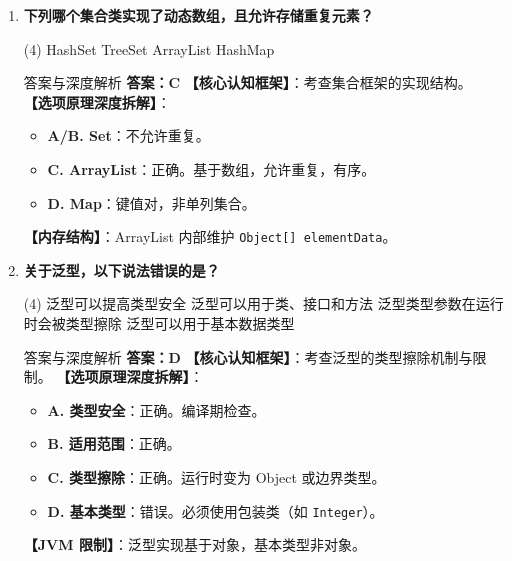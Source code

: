 ﻿\documentclass[12pt, a4paper]{ctexart}
\newcommand{\code}[1]{\texttt{#1}}
\begin{document}
\begin{enumerate}[label=\textbf{\arabic*.}, itemsep=1em]
	\item \textbf{下列哪个集合类实现了动态数组，且允许存储重复元素？}
	      \begin{tasks}(4)
		      \task HashSet \task TreeSet \task ArrayList \task HashMap
	      \end{tasks}
	      \begin{bluebox}{答案与深度解析}
		      \textbf{答案：C}
		      \textbf{【核心认知框架】}：考查集合框架的实现结构。
		      \textbf{【选项原理深度拆解】}：
		      \begin{itemize}[leftmargin=*, nosep]
			      \item \textbf{A/B. Set}：不允许重复。
			      \item \textbf{C. ArrayList}：正确。基于数组，允许重复，有序。
			      \item \textbf{D. Map}：键值对，非单列集合。
		      \end{itemize}
		      \textbf{【内存结构】}：ArrayList 内部维护 \code{Object[] elementData}。
	      \end{bluebox}

	\item \textbf{关于泛型，以下说法错误的是？}
	      \begin{tasks}(4)
		      \task 泛型可以提高类型安全 \task 泛型可以用于类、接口和方法
		      \task 泛型类型参数在运行时会被类型擦除 \task 泛型可以用于基本数据类型
	      \end{tasks}
	      \begin{bluebox}{答案与深度解析}
		      \textbf{答案：D}
		      \textbf{【核心认知框架】}：考查泛型的类型擦除机制与限制。
		      \textbf{【选项原理深度拆解】}：
		      \begin{itemize}[leftmargin=*, nosep]
			      \item \textbf{A. 类型安全}：正确。编译期检查。
			      \item \textbf{B. 适用范围}：正确。
			      \item \textbf{C. 类型擦除}：正确。运行时变为 Object 或边界类型。
			      \item \textbf{D. 基本类型}：错误。必须使用包装类（如 \code{Integer}）。
		      \end{itemize}
		      \textbf{【JVM 限制】}：泛型实现基于对象，基本类型非对象。
	      \end{bluebox}


\end{enumerate}
\end{document}
